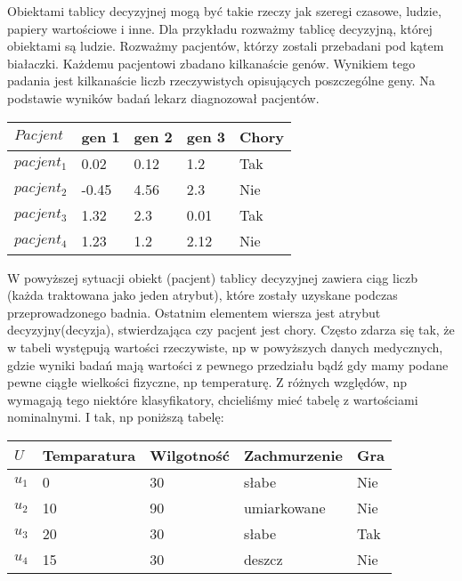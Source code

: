 \documentclass[magisterska]{pracamgr}
\theoremstyle{plain}
\theoremstyle{definition}
\theoremstyle{remark}
\begin{document}
Obiektami tablicy decyzyjnej mogą być takie rzeczy jak szeregi czasowe, ludzie,
papiery wartościowe i inne. \newline Dla przykładu rozważmy tablicę decyzyjną,
której obiektami są ludzie. Rozważmy pacjentów, którzy zostali przebadani pod kątem białaczki.
Każdemu pacjentowi zbadano kilkanaście genów. Wynikiem tego padania jest kilkanaście 
liczb rzeczywistych opisujących poszczególne geny. Na podstawie wyników badań lekarz diagnozował pacjentów.
\newline
\begin{center}
 \begin{tabular}{l || P{2.5cm} P{2.5cm} P{2.5cm} | P{1.5cm}}
  $Pacjent$     & gen 1 & gen 2 & gen 3 & Chory \\ 
  \hline
  $pacjent_{1}$ & 0.02       & 0.12       & 1.2    & Tak \\
  $pacjent_{2}$ & -0.45      & 4.56       & 2.3    & Nie \\
  $pacjent_{3}$ & 1.32       & 2.3        & 0.01   & Tak \\
  $pacjent_{4}$ & 1.23       & 1.2        & 2.12   & Nie \\
 \end{tabular}
\end{center}
W powyższej sytuacji obiekt (pacjent) tablicy decyzyjnej zawiera ciąg liczb (każda traktowana jako
jeden atrybut), które zostały uzyskane podczas przeprowadzonego badnia. Ostatnim elementem wiersza
jest atrybut decyzyjny(decyzja), stwierdzająca czy pacjent jest chory.
\newline
Często zdarza się tak, że w tabeli występują wartości rzeczywiste, np w powyższych danych medycznych, gdzie 
wyniki badań mają wartości z pewnego przedziału bądź gdy mamy podane pewne ciągłe wielkości fizyczne, np
temperaturę. Z różnych względów, np wymagają tego niektóre klasyfikatory, chcieliśmy mieć tabelę z wartościami
nominalnymi. I tak, np poniższą tabelę:

\begin{center}
 \begin{tabular}{l || P{2.5cm} P{2.5cm} P{2.5cm} | P{1.5cm}}
  $U$     & Temparatura & Wilgotność & Zachmurzenie & Gra \\ 
  \hline
  $u_{1}$ & 0      & 30      & słabe          & Nie \\
  $u_{2}$ & 10     & 90      & umiarkowane    & Nie \\
  $u_{3}$ & 20     & 30      & słabe   	      & Tak \\
  $u_{4}$ & 15     & 30      & deszcz         & Nie \\
 \end{tabular}
\end{center}
\end{document}
